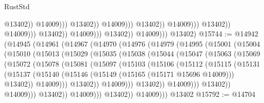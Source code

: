 \begin{lexlean}{RustStd}
\begin{coremodule}
                                                                  @13402))
                                                              @14009)))
                                                        @13402))
                                                    @14009)))
                                              @13402))
                                          @14009)))
                                    @13402))
                                @14009)))
                          @13402))
                      @14009)))
                @13402))
            @14009)))
      @13402)
@15744 := @14942
    (@14945
      (@14961
        (@14967
          (@14970
            (@14976
              (@14979
                (@14995
                  (@15001
                    (@15004
                      (@15010
                        (@15013
                          (@15029
                            (@15035
                              (@15038
                                (@15044
                                  (@15047
                                    (@15063
                                      (@15069
                                        (@15072
                                          (@15078
                                            (@15081
                                              (@15097
                                                (@15103
                                                  (@15106
                                                    (@15112
                                                      (@15115
                                                        (@15131
                                                          (@15137
                                                            (@15140
                                                              (@15146
                                                                (@15149
                                                                  (@15165 (@15171 @15696 @14009)))
                                                                @13402))
                                                            @14009)))
                                                      @13402))
                                                  @14009)))
                                            @13402))
                                        @14009)))
                                  @13402))
                              @14009)))
                        @13402))
                    @14009)))
              @13402))
          @14009)))
    @13402
@15792 := @14704

\end{coremodule}
\end{lexlean}
